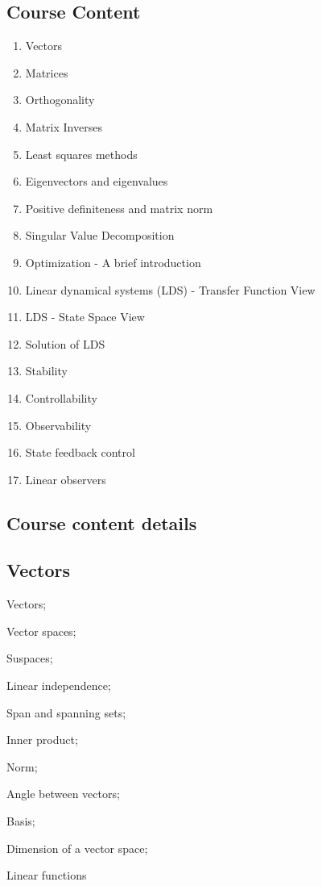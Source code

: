 \documentclass[fontsize=9pt]{scrbook}
\begin{document}
\begin{multicols}{2}
\section*{Course Content}
\begin{enumerate}
    \item Vectors
    \item Matrices
    \item Orthogonality
    \item Matrix Inverses
    \item Least squares methods
    \item Eigenvectors and eigenvalues
    \item Positive definiteness and matrix norm 
    \item Singular Value Decomposition
    \item Optimization - A brief introduction
    \item Linear dynamical systems (LDS) - Transfer Function View
    \item LDS - State Space View
    \item Solution of LDS
    \item Stability
    \item Controllability
    \item Observability
    \item State feedback control
    \item Linear observers
\end{enumerate}
\vfill\clearpage

\subsection*{Course content details}
\subsection*{Vectors}
\begin{enumerate*}
    \item Vectors;
    \item Vector spaces;
    \item Suspaces;
    \item Linear independence;
    \item Span and spanning sets;
    \item Inner product;
    \item Norm;
    \item Angle between vectors;
    \item Basis;
    \item Dimension of a vector space;
    \item Linear functions
\end{enumerate*}


\end{multicols}
\end{document}
